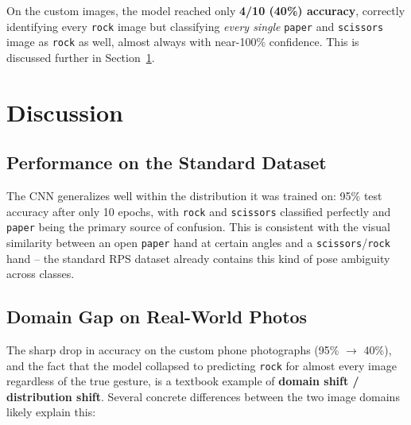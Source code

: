 \documentclass[11pt,a4paper]{article}
\begin{document}
On the custom images, the model reached only \textbf{4/10 (40\%) accuracy}, correctly identifying every \texttt{rock} image but classifying \emph{every single} \texttt{paper} and \texttt{scissors} image as \texttt{rock} as well, almost always with near-100\% confidence. This is discussed further in Section~\ref{sec:discussion}.

\section{Discussion}
\label{sec:discussion}

\subsection{Performance on the Standard Dataset}
The CNN generalizes well within the distribution it was trained on: 95\% test accuracy after only 10 epochs, with \texttt{rock} and \texttt{scissors} classified perfectly and \texttt{paper} being the primary source of confusion. This is consistent with the visual similarity between an open \texttt{paper} hand at certain angles and a \texttt{scissors}/\texttt{rock} hand -- the standard RPS dataset already contains this kind of pose ambiguity across classes.

\subsection{Domain Gap on Real-World Photos}
The sharp drop in accuracy on the custom phone photographs (95\% $\to$ 40\%), and the fact that the model collapsed to predicting \texttt{rock} for almost every image regardless of the true gesture, is a textbook example of \textbf{domain shift / distribution shift}. Several concrete differences between the two image domains likely explain this:
\end{document}
